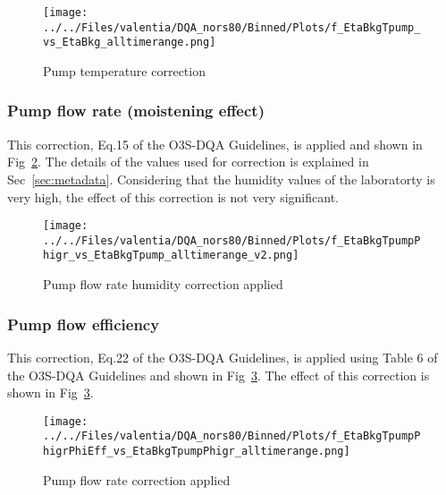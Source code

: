 \documentclass{article}
\begin{document}
%
                    \begin{figure}
        \centering
\texttt{[image: ../../Files/valentia/DQA\_nors80/Binned/Plots/f\_EtaBkgTpump\_vs\_EtaBkg\_alltimerange.png]}
    \caption{Pump temperature correction }
            \label{fig:tpump}
    \end{figure}
                \subsubsection{Pump flow rate (moistening effect)}
    This correction, Eq.15 of the O3S-DQA Guidelines, is applied and shown in Fig~\ref{fig:pf_ptu}. The details of the
values used for correction is explained in Sec~\ref{sec:metadata}. Considering that the humidity values of the laboratorty
is very high, the effect of this correction is not very significant.
%
                        \begin{figure}
        \centering
\texttt{[image: ../../Files/valentia/DQA\_nors80/Binned/Plots/f\_EtaBkgTpumpPhigr\_vs\_EtaBkgTpump\_alltimerange\_v2.png]}
    \caption{Pump flow rate humidity correction applied}
            \label{fig:pf_ptu}
    \end{figure}
                   \subsubsection{Pump flow efficiency}
    This correction, Eq.22 of the O3S-DQA Guidelines, is applied using Table 6 of the O3S-DQA Guidelines and
    shown in Fig~\ref{fig:pf_eff}.
The effect of this correction is shown in Fig~\ref{fig:pf_eff}.
%
                        \begin{figure}
        \centering
\texttt{[image: ../../Files/valentia/DQA\_nors80/Binned/Plots/f\_EtaBkgTpumpPhigrPhiEff\_vs\_EtaBkgTpumpPhigr\_alltimerange.png]}
    \caption{Pump flow rate correction applied}
            \label{fig:pf_eff}
    \end{figure}
\end{document}
